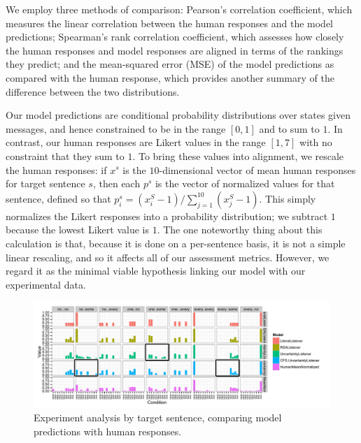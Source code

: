 \documentclass[leqno]{article}
\begin{document}

We employ three methods of comparison: Pearson's correlation
coefficient, which measures the linear correlation between the human
responses and the model predictions; Spearman's rank correlation
coefficient, which assesses how closely the human responses and model
responses are aligned in terms of the rankings they predict; and the
mean-squared error (MSE) of the model predictions as compared with the
human response, which provides another summary of the difference
between the two distributions.

Our model predictions are conditional probability distributions over
states given messages, and hence constrained to be in the range
$[0,1]$ and to sum to $1$. In contrast, our human responses are Likert
values in the range $[1,7]$ with no constraint that they sum to
$1$. To bring these values into alignment, we rescale the human
responses: if $x^{s}$ is the $10$-dimensional vector of mean human
responses for target sentence $s$, then each $p^{s}$ is the vector of
normalized values for that sentence, defined so that $p^{s}_{i} =
(x^{S}_{i}-1)/\sum_{j=1}^{10}(x^{S}_{j}-1)$. This simply normalizes
the Likert responses into a probability distribution; we subtract $1$
because the lowest Likert value is $1$. The one noteworthy thing about
this calculation is that, because it is done on a per-sentence basis,
it is not a simple linear rescaling, and so it affects all of our
assessment metrics. However, we regard it as the minimal viable
hypothesis linking our model with our experimental data.

\begin{figure}[t]
  \centering
  \includegraphics[width=1\textwidth]{fig/allmodels2}
  \caption{Experiment analysis by target sentence, 
    comparing model predictions with human responses.}
  \label{fig:exp-analysis}
\end{figure}
\end{document}
